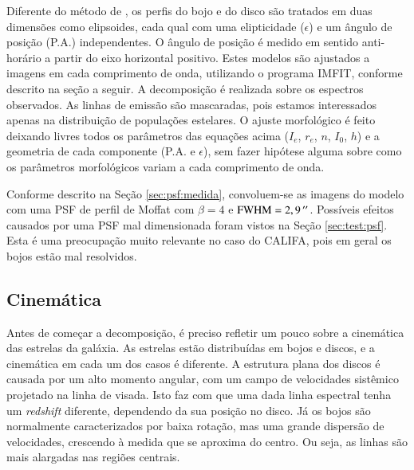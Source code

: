 Diferente do método de \citeauthor{Johnston2012}, os perfis do bojo e do disco
são tratados em duas dimensões como elipsoides, cada qual com uma elipticidade
($\epsilon$) e um ângulo de posição (P.A.) independentes. O ângulo de posição é
medido em sentido anti-horário a partir do eixo horizontal positivo. Estes
modelos são ajustados a imagens em cada comprimento de onda, utilizando o
programa IMFIT, conforme descrito na seção a seguir. A decomposição é realizada
sobre os espectros observados. As linhas de emissão são mascaradas, pois estamos
interessados apenas na distribuição de populações estelares.
O ajuste morfológico é feito deixando livres todos os parâmetros das equações
acima ($I_e$, $r_e$, $n$, $I_0$, $h$) e a geometria de cada componente (P.A. e
$\epsilon$), sem fazer hipótese alguma sobre como os parâmetros morfológicos
variam a cada comprimento de onda.

Conforme descrito na Seção \ref{sec:psf:medida}, convoluem-se as imagens do
modelo com uma PSF de perfil de Moffat com $\beta=4$ e
$\mathrm{FWHM}=2,9\,^{\prime\prime}$. Possíveis efeitos causados por uma PSF mal
dimensionada foram vistos na Seção \ref{sec:test:psf}. Esta é uma preocupação
muito relevante no caso do CALIFA, pois em geral os bojos estão mal resolvidos.




\subsection{Cinemática}
\label{sec:Decomp:cinematica}

Antes de começar a decomposição, é preciso refletir um pouco sobre a cinemática
das estrelas da galáxia. As estrelas estão distribuídas em bojos e discos, e a
cinemática em cada um dos casos é diferente.
A estrutura plana dos discos é causada por um alto momento angular, com um campo
de velocidades sistêmico projetado na linha de visada. Isto faz com que uma dada
linha espectral tenha um {\em redshift} diferente, dependendo da sua posição no
disco. Já os bojos são normalmente caracterizados por baixa rotação, mas uma
grande dispersão de velocidades, crescendo à medida que se aproxima do centro.
Ou seja, as linhas são mais alargadas nas regiões centrais.

